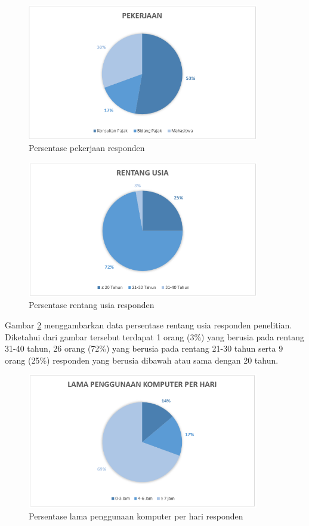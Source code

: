 \begin{figure}
	\centering
	\includegraphics[width=0.9\textwidth,height=0.52\textwidth]
	{pics/pekerjaan.PNG}
	\caption{Persentase pekerjaan responden}
	\label{fig:kerja}
\end{figure}
\begin{figure}
	\centering
	\includegraphics[width=0.9\textwidth,height=0.52\textwidth]
	{pics/rentangUsia.PNG}
	\caption{Persentase rentang usia responden}
	\label{fig:usia}
\end{figure}
\noindent
Gambar \ref{fig:usia} menggambarkan data persentase rentang usia responden penelitian. Diketahui dari gambar tersebut terdapat 1 orang (3\%) yang berusia pada rentang 31-40 tahun, 26 orang (72\%) yang berusia pada rentang 21-30 tahun serta 9 orang (25\%) responden yang berusia dibawah atau sama dengan 20 tahun.
\begin{figure}
	\centering
	\includegraphics[width=0.9\textwidth,height=0.52\textwidth]
	{pics/lamakomputer.PNG}
	\caption{Persentase lama penggunaan komputer per hari responden}
	\label{fig:komp}
\end{figure}
